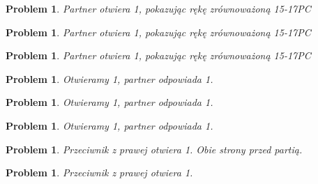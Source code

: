 \documentclass[12pt, a4paper]{article}
\newtheorem{problem}[table]{Problem}
\begin{document}
\begin{problem}
    Partner otwiera \emph{1\nt}, pokazując rękę zrównoważoną 15-17PC
\end{problem}
\begin{center}
\end{center}

\pagebreak

\begin{problem}
    Partner otwiera \emph{1\nt}, pokazując rękę zrównoważoną 15-17PC
\end{problem}
\begin{center}
\end{center}

\begin{problem}
    Partner otwiera \emph{1\nt}, pokazując rękę zrównoważoną 15-17PC
\end{problem}
\begin{center}
\end{center}

\begin{problem}
    Otwieramy \emph{1\clubs}, partner odpowiada \emph{1\spades}.
\end{problem}
\begin{center}
\end{center}

\begin{problem}
    Otwieramy \emph{1\clubs}, partner odpowiada \emph{1\spades}.
\end{problem}
\begin{center}
\end{center}

\begin{problem}
    Otwieramy \emph{1\clubs}, partner odpowiada \emph{1\spades}.
\end{problem}
\begin{center}
\end{center}

\begin{problem}
    Przeciwnik z prawej otwiera \emph{1\diams}. Obie strony przed partią.
\end{problem}
\begin{center}
\end{center}

\begin{problem}
    Przeciwnik z prawej otwiera \emph{1\diams}.
\end{problem}
\begin{center}
\end{center}
\end{document}
